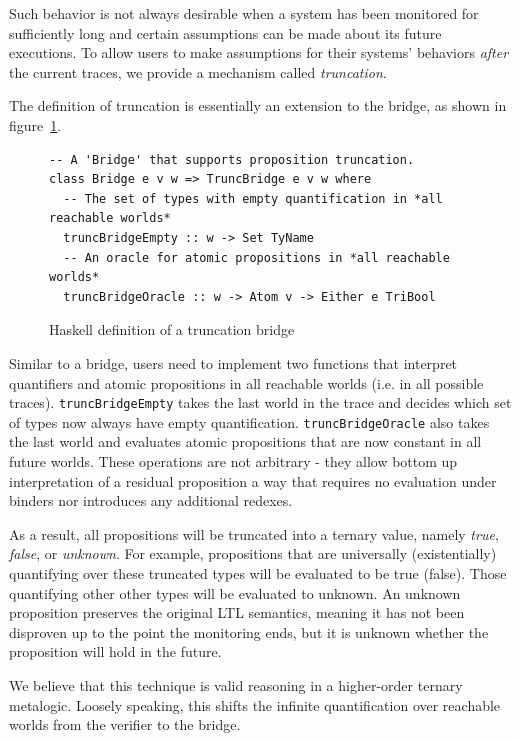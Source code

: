 \documentclass[format=acmsmall, nonacm=true, review=true, screen=true]{acmart}
\newcommand{\mycaption}[1]{\Description{#1}\caption{#1}}
\begin{document}
Such behavior is not always desirable when a system has been monitored for sufficiently long and certain assumptions can be made about its future executions.
To allow users to make assumptions for their systems' behaviors \textit{after} the current traces, we provide a mechanism called \textit{truncation}.

The definition of truncation is essentially an extension to the bridge, as shown in figure~\ref{fig:truncation-sig}.

\begin{figure}[h]
  {
    \fontsize{10}{12}\selectfont
    \begin{verbatim}
-- A 'Bridge' that supports proposition truncation.
class Bridge e v w => TruncBridge e v w where
  -- The set of types with empty quantification in *all reachable worlds*
  truncBridgeEmpty :: w -> Set TyName
  -- An oracle for atomic propositions in *all reachable worlds*
  truncBridgeOracle :: w -> Atom v -> Either e TriBool
\end{verbatim}
  }
  \mycaption{Haskell definition of a truncation bridge}
  \label{fig:truncation-sig}
\end{figure}

Similar to a bridge, users need to implement two functions that interpret quantifiers and atomic propositions in all reachable worlds (i.e. in all possible traces).
\texttt{truncBridgeEmpty} takes the last world in the trace and decides which set of types now always have empty quantification.
\texttt{truncBridgeOracle} also takes the last world and evaluates atomic propositions that are now constant in all future worlds.
These operations are not arbitrary - they allow bottom up interpretation of a residual proposition a way that requires no evaluation under binders nor introduces any additional redexes.

As a result, all propositions will be truncated into a ternary value, namely \textit{true}, \textit{false}, or \textit{unknown}.
For example, propositions that are universally (existentially) quantifying over these truncated types will be evaluated to be true (false). Those quantifying other other types will be evaluated to unknown.
An unknown proposition preserves the original LTL semantics, meaning it has not been disproven up to the point the monitoring ends, but it is unknown whether the proposition will hold in the future.

We believe that this technique is valid reasoning in a higher-order ternary metalogic. Loosely speaking, this shifts the infinite quantification over reachable worlds from the verifier to the bridge.
\end{document}
